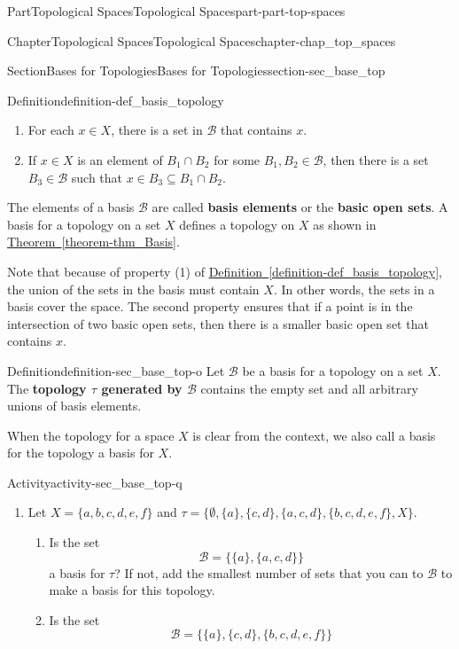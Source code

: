 \documentclass[oneside,10pt,]{book}
\newcommand{\xreffont}{\relax}
\newcommand{\terminology}[1]{\textbf{#1}}
\numberwithin{equation}{chapter}
\newcommand{\B}{\mathcal{B}}
\begin{document}
\begin{partptx}{Part}{Topological Spaces}{}{Topological Spaces}{}{}{part-part-top-spaces}
\begin{chapterptx}{Chapter}{Topological Spaces}{}{Topological Spaces}{}{}{chapter-chap_top_spaces}
\begin{sectionptx}{Section}{Bases for Topologies}{}{Bases for Topologies}{}{}{section-sec_base_top}
\begin{definition}{Definition}{}{definition-def_basis_topology}
\begin{enumerate}
\item{}For each \(x \in X\), there is a set in \(\B\) that contains \(x\).%
\item{}If \(x \in X\) is an element of \(B_1 \cap B_2\) for some \(B_1, B_2 \in \B\), then there is a set \(B_3 \in \B\) such that \(x \in B_3 \subseteq B_1 \cap B_2\).%
\end{enumerate}
%
\end{definition}
 The elements of a basis \(\B\) are called \terminology{basis elements} or the \terminology{basic open sets}. A basis for a topology on a set \(X\) defines a topology on \(X\) as shown in \hyperref[theorem-thm_Basis]{Theorem~{\xreffont\ref{theorem-thm_Basis}}}.%
\par
Note that because of property (1) of \hyperref[definition-def_basis_topology]{Definition~{\xreffont\ref{definition-def_basis_topology}}}, the union of the sets in the basis must contain \(X\). In other words, the sets in a basis cover the space. The second property ensures that if a point is in the intersection of two basic open sets, then there is a smaller basic open set that contains \(x\).%
\begin{definition}{Definition}{}{definition-sec_base_top-o}%
%
Let \(\B\) be a basis for a topology on a set \(X\). The \terminology{topology \(\tau\) generated by \(\B\)} contains the empty set and all arbitrary unions of basis elements.%
\end{definition}
When the topology for a space \(X\) is clear from the context, we also call a basis for the topology a basis for \(X\).%
\begin{activity}{Activity}{}{activity-sec_base_top-q}%
\begin{enumerate}[font=\bfseries,label=(\alph*),ref=\alph*]%
\item{}Let \(X=\{a,b,c,d,e,f\}\) and \(\tau= \{\emptyset, \{a\}, \{c,d\},\{a,c,d\}, \{b,c,d,e,f\}, X \}\).%
\begin{enumerate}[font=\bfseries,label=(\roman*),ref=\theenumi.\roman*]%
\item{}Is the set%
\begin{equation*}
\mathcal{B}  = \{\{a\},\{a,c,d\} \}
\end{equation*}
a basis for \(\tau\)? If not, add the smallest number of sets that you can to \(\mathcal{B}\) to make a basis for this topology.%
\item{}Is the set%
\begin{equation*}
\mathcal{B}  = \{\{a\},\{c,d\},\{b,c,d,e,f\} \}

\end{equation*}
\end{enumerate}
\end{enumerate}
\end{activity}
\end{sectionptx}
\end{chapterptx}
\end{partptx}
\end{document}
